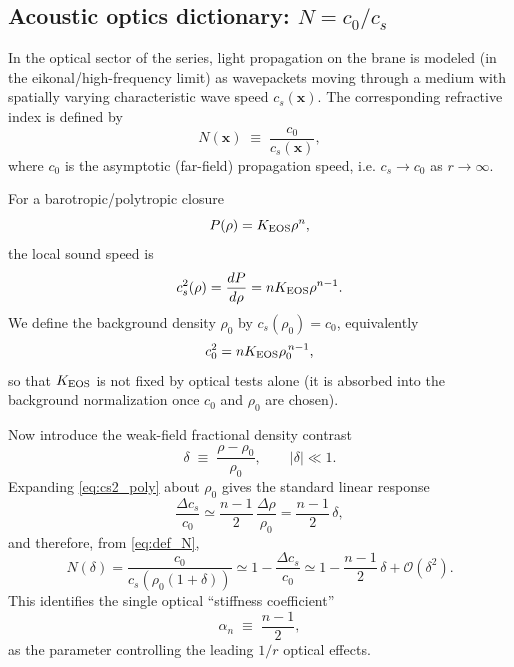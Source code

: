 \documentclass[11pt]{article}
\begin{document}
\subsection{Acoustic optics dictionary: \texorpdfstring{$N=c_0/c_s$}{N=c\_0/c\_s}}

In the optical sector of the series, light propagation on the brane is modeled (in the eikonal/high-frequency limit) as wavepackets moving through a medium with spatially varying characteristic wave speed $c_s(\mathbf{x})$. The corresponding refractive index is defined by
\begin{equation}
N(\mathbf{x}) \;\equiv\; \frac{c_0}{c_s(\mathbf{x})},
\label{eq:def_N}
\end{equation}
where $c_0$ is the asymptotic (far-field) propagation speed, i.e. $c_s\to c_0$ as $r\to\infty$. 

For a barotropic/polytropic closure
\begin{equation}
P(\rho)=K_{\rm EOS}\rho^n,
\label{eq:poly_eos}
\end{equation}
the local sound speed is
\begin{equation}
c_s^2(\rho)=\frac{dP}{d\rho}=nK_{\rm EOS}\rho^{n-1}.
\label{eq:cs2_poly}
\end{equation}
We define the background density $\rho_0$ by $c_s(\rho_0)=c_0$, equivalently
\begin{equation}
c_0^2 = nK_{\rm EOS}\rho_0^{\,n-1},
\label{eq:c0_def}
\end{equation}
so that $K_{\rm EOS}$ is not fixed by optical tests alone (it is absorbed into the background normalization once $c_0$ and $\rho_0$ are chosen). 

Now introduce the weak-field fractional density contrast
\begin{equation}
\delta \;\equiv\; \frac{\rho-\rho_0}{\rho_0},\qquad |\delta|\ll 1.
\end{equation}
Expanding \eqref{eq:cs2_poly} about $\rho_0$ gives the standard linear response
\begin{equation}
\frac{\Delta c_s}{c_0}
\simeq
\frac{n-1}{2}\,\frac{\Delta\rho}{\rho_0}
=
\frac{n-1}{2}\,\delta,
\label{eq:dcs_linear}
\end{equation}
and therefore, from \eqref{eq:def_N},
\begin{equation}
N(\delta)
=
\frac{c_0}{c_s(\rho_0(1+\delta))}
\simeq
1-\frac{\Delta c_s}{c_0}
\simeq
1-\frac{n-1}{2}\,\delta
+\mathcal{O}(\delta^2).
\label{eq:N_delta_general}
\end{equation}
This identifies the single optical ``stiffness coefficient''
\begin{equation}
\alpha_n \;\equiv\; \frac{n-1}{2},
\label{eq:alpha_n_def}
\end{equation}
as the parameter controlling the leading $1/r$ optical effects. 
\end{document}
